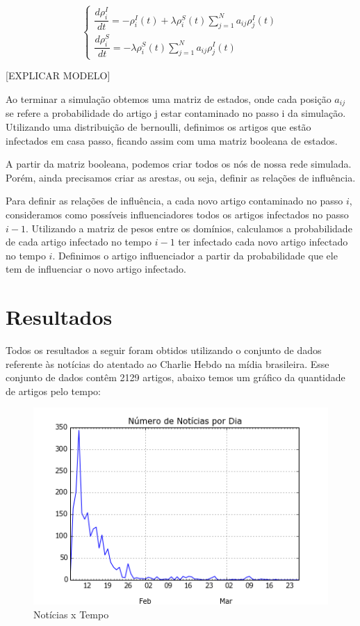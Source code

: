 \documentclass[a4paper,12pt]{article}
\begin{document}
 \begin{equation}
  \begin{cases}

   \dfrac{d\rho^{I}_{i}}{dt} = -\rho^{I}_{i}(t) + \lambda\rho_{i}^{S}(t) \sum_{j=1}^{N} a_{ij}\rho_{j}^{I}(t) \\     
   \dfrac{d\rho^{S}_{i}}{dt} = - \lambda\rho_{i}^{S}(t) \sum_{j=1}^{N} a_{ij}\rho_{j}^{I}(t)
   
  \end{cases}
 \end{equation}


   [EXPLICAR MODELO]
  
  Ao terminar a simulação obtemos uma matriz de estados, onde cada posição $a_{ij}$ se refere a probabilidade do artigo
  j estar contaminado no passo i da simulação. Utilizando uma distribuição de bernoulli, definimos os artigos que estão infectados
  em casa passo, ficando assim com uma matriz booleana de estados.
  
  A partir da matriz booleana, podemos criar todos os nós de nossa rede simulada. Porém, ainda precisamos criar as arestas, ou seja, definir
  as relações de influência. 
  
  Para definir as relações de influência, a cada novo artigo contaminado no passo $i$, consideramos como possíveis influenciadores todos os artigos
  infectados no passo $i-1$. Utilizando a matriz de pesos entre os domínios, calculamos a probabilidade de cada artigo infectado no tempo
  $i-1$ ter infectado cada novo artigo infectado no tempo $i$. Definimos o artigo influenciador a partir da probabilidade que ele tem de 
  influenciar o novo artigo infectado. 

  
  

\pagebreak  
\section{Resultados}
 
Todos os resultados a seguir foram obtidos utilizando o conjunto de dados referente às notícias do atentado ao Charlie Hebdo na mídia
brasileira. 
Esse conjunto de dados contêm 2129 artigos, abaixo temos um gráfico da quantidade de artigos pelo tempo:

\begin{figure}[h]
 \centering
 \includegraphics[scale=0.7]{./grafic.png}
 \caption{Notícias x Tempo}
\end{figure}
\end{document}
